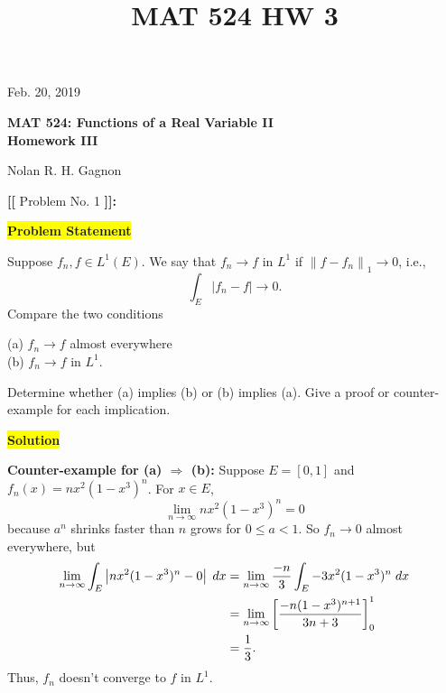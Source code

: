 \documentclass[12pt]{article}
\title{MAT 524 HW 3}
\newcommand\norm[1]{\left\lVert#1\right\rVert}
\newcommand{\mybox}{%
    \collectbox{%
        \setlength{\fboxsep}{2pt}%
        \fbox{\BOXCONTENT}%
    }%
}
\begin{document}
\hfill Feb. 20, 2019
\begin{center}
\begin{large}
\textbf{MAT 524: Functions of a Real Variable II \\
\vspace{-5mm}
Homework III\\}
\end{large}
\vspace{-2mm}
Nolan R. H. Gagnon \\
\end{center}

\vspace{5mm}

\noindent \textbf{{\huge [}{\Large [}} Problem No. 1 \textbf{{\Large ]}{\huge ]}}{\Large \textbf{:}}

\vspace{3mm}

\noindent\mybox{\colorbox{yellow}{\textbf{Problem Statement}}}\hspace{3mm}\hrulefill

\noindent Suppose $f_n, f\in L^1(E)$. We say that $f_n\rightarrow f$ in $L^1$ if $\norm{f-f_n}_1\rightarrow 0$, i.e., $$\int_E|f_n-f| \longrightarrow 0.$$
Compare the two conditions

\noindent(a) $f_n\rightarrow f$ almost everywhere\\
\noindent(b) $f_n\rightarrow f$ in $L^1.$

\noindent Determine whether (a) implies (b) or (b) implies (a). Give a proof or counter-example for each implication.

\noindent\mybox{\colorbox{yellow}{\textbf{Solution}}}\hspace{3mm}\hrulefill

\noindent \textbf{Counter-example for (a) $\Rightarrow$ (b):} Suppose $E=[0,1]$ and $f_n(x) = nx^2(1-x^3)^n$. For $x\in E$, $$\lim\limits_{n\rightarrow\infty} nx^2(1-x^3)^n = 0$$ because $a^n$ shrinks faster than $n$ grows for $0\leq a < 1$. So $f_n\rightarrow 0$ almost everywhere, but
\begin{align}
    \lim\limits_{n\rightarrow\infty}\int_E \left|nx^2(1-x^3)^n - 0\right| \hspace{1mm} dx &= \lim\limits_{n\rightarrow\infty}\frac{-n}{3}\int_E -3x^2(1-x^3)^n \hspace{1mm} dx \\
    &= \lim\limits_{n\rightarrow\infty} \left[\frac{-n(1-x^3)^{n+1}}{3n+3}\right]_0^1 \\
    &= \frac{1}{3}.
\end{align}
Thus, $f_n$ doesn't converge to $f$ in $L^1$.
\end{document}
